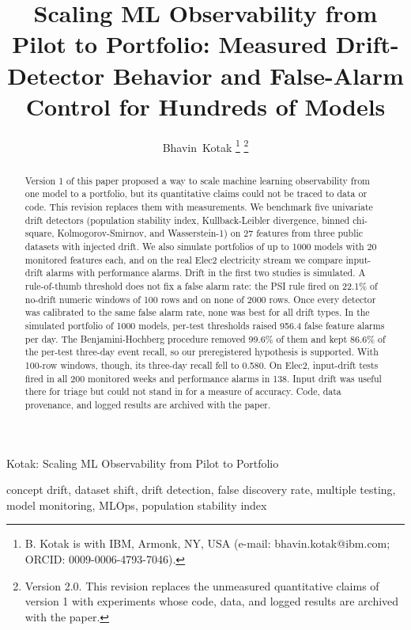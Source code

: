 \documentclass[journal]{IEEEtran}
\begin{document}
\title{Scaling ML Observability from Pilot to Portfolio: Measured Drift-Detector Behavior and False-Alarm Control for Hundreds of Models}

\author{Bhavin~Kotak%
\thanks{B. Kotak is with IBM, Armonk, NY, USA (e-mail: bhavin.kotak@ibm.com; ORCID: 0009-0006-4793-7046).}%
\thanks{Version 2.0. This revision replaces the unmeasured quantitative claims of version 1 with experiments whose code, data, and logged results are archived with the paper.}}

%
{Kotak: Scaling ML Observability from Pilot to Portfolio}

\maketitle

\begin{abstract}
Version 1 of this paper proposed a way to scale machine learning observability from one model to a portfolio, but its quantitative claims could not be traced to data or code. This revision replaces them with measurements. We benchmark five univariate drift detectors (population stability index, Kullback-Leibler divergence, binned chi-square, Kolmogorov-Smirnov, and Wasserstein-1) on 27 features from three public datasets with injected drift. We also simulate portfolios of up to 1000 models with 20 monitored features each, and on the real Elec2 electricity stream we compare input-drift alarms with performance alarms. Drift in the first two studies is simulated. A rule-of-thumb threshold does not fix a false alarm rate: the PSI rule fired on 22.1\% of no-drift numeric windows of 100 rows and on none of 2000 rows. Once every detector was calibrated to the same false alarm rate, none was best for all drift types. In the simulated portfolio of 1000 models, per-test thresholds raised 956.4 false feature alarms per day. The Benjamini-Hochberg procedure removed 99.6\% of them and kept 86.6\% of the per-test three-day event recall, so our preregistered hypothesis is supported. With 100-row windows, though, its three-day recall fell to 0.580. On Elec2, input-drift tests fired in all 200 monitored weeks and performance alarms in 138. Input drift was useful there for triage but could not stand in for a measure of accuracy. Code, data provenance, and logged results are archived with the paper.
\end{abstract}

\begin{IEEEkeywords}
concept drift, dataset shift, drift detection, false discovery rate, multiple testing, model monitoring, MLOps, population stability index
\end{IEEEkeywords}
\end{document}
